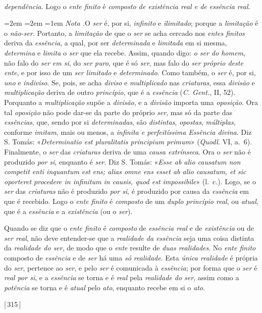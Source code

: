\documentclass[12pt,a4paper]{article}
\newcommand{\pg}[1]{\thinspace\textup{[\,#1\,]}\thinspace}
\renewcommand\footnote[1]{%
    \stepcounter{footnote}\textsuperscript{\thefootnote}%
    \par
    {\footnotesize
     \leftskip=2em \rightskip=2em \parindent=1em
     \addvspace{\medskipamount}%
     \noindent\textit{Nota \thefootnote.}\enspace #1\par
     \addvspace{\medskipamount}}%
  }
\begin{document}
\emph{dependência}. Logo o \emph{ente finito} é \emph{composto de existência
real e de essência real}.\footnote{O \emph{ser} é, por si, \emph{infinito} e
\emph{ilimitado}; porque a \emph{limitação} é o \emph{não-ser}. Portanto, a
\emph{limitação} de que o \emph{ser} se acha cercado nos \emph{entes finitos}
deriva da \emph{essência}, a qual, por ser \emph{determinada} e \emph{limitada}
em si mesma, \emph{determina} e \emph{limita} o \emph{ser} que ela recebe.
Assim, quando digo: \emph{o ser do homem}, não falo do \emph{ser em si}, do
\emph{ser puro}, que é só \emph{ser}, mas falo do \emph{ser próprio deste
ente}, e por isso de um \emph{ser limitado} e \emph{determinado}. \textemdash{}
Como também, o \emph{ser} é, por si, \emph{uno} e \emph{indiviso}. Se, pois, se
acha \emph{diviso} e \emph{multiplicado} nas \emph{criaturas}, essa
\emph{divisão} e \emph{multiplicação} deriva de outro \emph{princípio}, que é a
\emph{essência} (\emph{C. Gent.}, II, 52). Porquanto a \emph{multiplicação}
supõe a \emph{divisão}, e a \emph{divisão} importa uma \emph{oposição}. Ora tal
\emph{oposição} não pode dar-se da parte do próprio \emph{ser}, mas só da parte
das \emph{essências}, que, sendo por si \emph{determinadas}, são
\emph{distintas}, \emph{opostas}, \emph{múltiplas}, conforme \emph{imitam},
mais ou menos, a \emph{infinita e perfeitíssima Essência divina}. Diz S. Tomás:
«\textit{Determinatio est pluralitatis principium primum}» (\emph{Quodl.} VI,
a.~6). \textemdash{} Finalmente, o \emph{ser} das \emph{criaturas} deriva de
uma \emph{causa extrínseca}. Ora o \emph{ser} não é produzido \emph{por si},
enquanto é \emph{ser}. Diz S. Tomás: «\textit{Esse ab alio causatum non
competit enti inquantum est ens; alias omne ens esset ab alio causatum, et sic
oporteret procedere in infinitum in causis, quod est impossibile}» (l.~c.).
Logo, se o \emph{ser} das \emph{criaturas} não é produzido \emph{por si}, é
produzido por causa da \emph{essência} em que é recebido. \textemdash{} Logo o
\emph{ente finito} é \emph{composto} de um \emph{duplo princípio real}, ou
\emph{atual}, que é a \emph{essência} e a \emph{existência} (ou o \emph{ser}).

  Quando se diz que o \emph{ente finito} é \emph{composto} de \emph{essência
  real} e de \emph{existência} ou de \emph{ser real}, não deve entender-se que a
  \emph{realidade da essência} seja uma coisa distinta da \emph{realidade do
  ser}, de modo que o \emph{ente} resulte de \emph{duas realidades}. No
  \emph{ente finito} composto de \emph{essência} e de \emph{ser} há uma \emph{só
  realidade}. Esta \emph{única realidade} é própria do \emph{ser}, pertence ao
  \emph{ser}, e pelo \emph{ser} é comunicada à \emph{essência}; por forma que o
  \emph{ser} é \emph{real por si}, e a \emph{essência} se torna e é \emph{real}
  pela \emph{realidade do ser}, assim como a \emph{potência} se torna e é
  \emph{atual} pelo \emph{ato}, enquanto recebe em si o \emph{ato}.} \pg{315}
\end{document}
